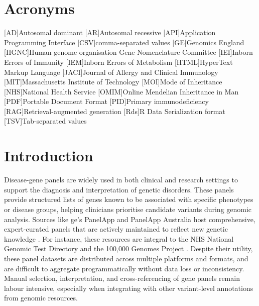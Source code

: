 \section*{Acronyms}
\renewenvironment{description} %
{\list{}{\labelwidth0pt\itemindent-\leftmargin
    \parsep-1em\itemsep0pt\let\makelabel\descriptionlabel}}
               {\endlist}
\begin{acronym} 
[AD]{Autosomal dominant}
[AR]{Autosomal recessive}
[API]{Application Programming Interface}
[CSV]{comma-separated values}
[GE]{Genomics England}
[HGNC]{Human genome organisation Gene Nomenclature Committee}
[IEI]{Inborn Errors of Immunity}
[IEM]{Inborn Errors of Metabolism}
[HTML]{HyperText Markup Language}
[JACI]{Journal of Allergy and Clinical Immunology}
[MIT]{Massachusetts Institute of Technology}
[MOI]{Mode of Inheritance}
[NHS]{National Health Service}
[OMIM]{Online Mendelian Inheritance in Man}
[PDF]{Portable Document Format}
[PID]{Primary immunodeficiency}
[RAG]{Retrieval-augmented generation}
[Rds]{R Data Serialization format}
[TSV]{Tab-separated values}
\end{acronym} 
 

\section{Introduction}
\noindent
Disease-gene panels are widely used in both clinical and research settings to support the diagnosis and interpretation of genetic disorders. 
These panels provide structured lists of genes known to be associated with specific phenotypes or disease groups, helping clinicians prioritise candidate variants during genomic analysis. 
Sources like \ac{ge}’s PanelApp and PanelApp Australia host comprehensive, expert-curated panels that are actively maintained to reflect new genetic knowledge \cite{martin_panelapp_2019}. 
For instance, these resources are integral to the NHS National Genomic Test Directory and the 100,000 Genomes Project \cite{martin_panelapp_2019}. 
Despite their utility, these panel datasets are distributed across multiple platforms and formats, and are difficult to aggregate programmatically without data loss or inconsistency. 
Manual selection, interpretation, and cross-referencing of gene panels remain labour intensive, especially when integrating with other variant-level annotations from genomic resources. 

